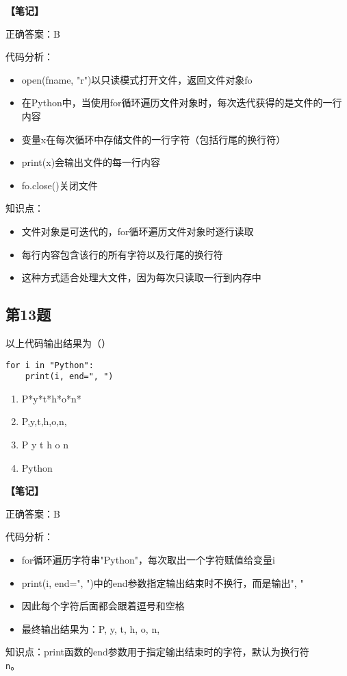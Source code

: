 \begin{mdframed}[linewidth=1pt, linecolor=black]

  \textbf{\color{red}【笔记】}

  正确答案：B

  代码分析：
  \begin{itemize}
    \item open(fname, "r")以只读模式打开文件，返回文件对象fo
    \item 在Python中，当使用for循环遍历文件对象时，每次迭代获得的是文件的一行内容
    \item 变量x在每次循环中存储文件的一行字符（包括行尾的换行符）
    \item print(x)会输出文件的每一行内容
    \item fo.close()关闭文件
  \end{itemize}

  知识点：
  \begin{itemize}
    \item 文件对象是可迭代的，for循环遍历文件对象时逐行读取
    \item 每行内容包含该行的所有字符以及行尾的换行符
    \item 这种方式适合处理大文件，因为每次只读取一行到内存中
  \end{itemize}

\end{mdframed}

\subsection{第13题}
以上代码输出结果为（）
\begin{lstlisting}
for i in "Python":
    print(i, end=", ")
\end{lstlisting}

\begin{enumerate}[label=\Alph*.]
  \item P*y*t*h*o*n*
  \item P,y,t,h,o,n,
  \item P y t h o n
  \item Python
\end{enumerate}

\begin{mdframed}[linewidth=1pt, linecolor=black]

  \textbf{\color{red}【笔记】}

  正确答案：B

  代码分析：
  \begin{itemize}
    \item for循环遍历字符串"Python"，每次取出一个字符赋值给变量i
    \item print(i, end=", ")中的end参数指定输出结束时不换行，而是输出", "
    \item 因此每个字符后面都会跟着逗号和空格
    \item 最终输出结果为：P, y, t, h, o, n,
  \end{itemize}

  知识点：print函数的end参数用于指定输出结束时的字符，默认为换行符\texttt{\\n}。

\end{mdframed}

